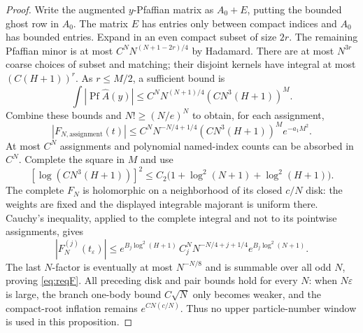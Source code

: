 \documentclass[11pt]{article}
\numberwithin{equation}{section}
\theoremstyle{definition}
\newcommand{\eps}{\varepsilon}
\newcommand{\Pf}{\operatorname{Pf}}
\begin{document}
\begin{proof}
Write the augmented \(y\)-Pfaffian matrix as \(A_0+E\), putting the bounded ghost row in \(A_0\). The matrix \(E\) has entries
only between compact indices and \(A_0\) has bounded entries.
Expand in an even compact subset of size \(2r\). The remaining
Pfaffian minor is at most \(C^N N^{(N+1-2r)/4}\) by Hadamard.
There are at most \(N^{3r}\) coarse choices of subset and matching;
their disjoint kernels have integral at most \((C(H+1))^r\).
As \(r\le M/2\), a sufficient bound is
\[
 \int|\Pf\widehat A(y)|\le C^N N^{(N+1)/4}(CN^3(H+1))^M.
 \]
Combine these bounds and \(N!\ge(N/e)^N\) to obtain, for each assignment,
\[
 |F_{N,\mathrm{assignment}}(t)|
 \le C^N N^{-N/4+1/4}(CN^3(H+1))^M e^{-a_1M^2}.
 \]
At most $C^N$ assignments and polynomial named-index counts can be
absorbed in $C^N$. Complete the square in $M$ and use
\[
 [\log(CN^3(H+1))]^2\le C_2\bigl(1+\log^2(N+1)+\log^2(H+1)\bigr).
\]
The complete $F_N$ is holomorphic on a neighborhood of its closed
$c/N$ disk: the weights are fixed and the displayed integrable
majorant is uniform there. Cauchy's inequality, applied to the
complete integral and not to its pointwise assignments, gives
\[
 |F_N^{(j)}(t_\eps)|\le
 e^{B_j\log^2(H+1)}\,
 C_j^N N^{-N/4+j+1/4}e^{B_j\log^2(N+1)}.
\]
The last $N$-factor is eventually at most $N^{-N/8}$ and is
summable over all odd $N$, proving \eqref{eq:reqF}. All preceding
disk and pair bounds hold for every $N$: when $N\eps$ is large,
the branch one-body bound $C\sqrt N$ only becomes weaker, and
the compact-root inflation remains $e^{CN(c/N)}$. Thus no upper
particle-number window is used in this proposition.
\end{proof}
\end{document}
